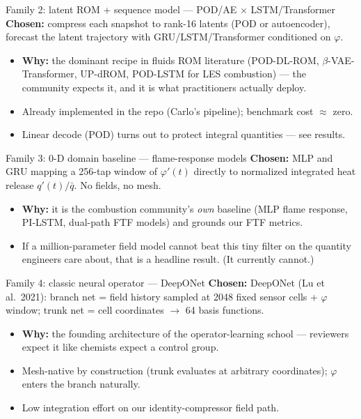 \documentclass[10pt]{beamer}
\begin{document}
\begin{frame}{Family 2: latent ROM + sequence model --- POD/AE $\times$ LSTM/Transformer}
  \textbf{Chosen:} compress each snapshot to rank-16 latents (POD or autoencoder), forecast the
  latent trajectory with GRU/LSTM/Transformer conditioned on $\varphi$.
  \begin{itemize}
    \item \textbf{Why:} the dominant recipe in fluids ROM literature
          (POD-DL-ROM, $\beta$-VAE-Transformer, UP-dROM, POD-LSTM for LES combustion) ---
          the community expects it, and it is what practitioners actually deploy.
    \item Already implemented in the repo (Carlo's pipeline); benchmark cost $\approx$ zero.
    \item Linear decode (POD) turns out to protect integral quantities --- see results.
  \end{itemize}
\end{frame}

\begin{frame}{Family 3: 0-D domain baseline --- flame-response models}
  \textbf{Chosen:} MLP and GRU mapping a 256-tap window of $\varphi'(t)$ directly to normalized
  integrated heat release $q'(t)/\bar q$. No fields, no mesh.
  \begin{itemize}
    \item \textbf{Why:} it is the combustion community's \emph{own} baseline
          (MLP flame response, PI-LSTM, dual-path FTF models) and grounds our FTF metrics.
    \item If a million-parameter field model cannot beat this tiny filter on the quantity
          engineers care about, that is a headline result. (It currently cannot.)
  \end{itemize}
\end{frame}

\begin{frame}{Family 4: classic neural operator --- DeepONet}
  \textbf{Chosen:} DeepONet (Lu et al.\ 2021): branch net = field history sampled at 2048 fixed
  sensor cells + $\varphi$ window; trunk net = cell coordinates $\to$ 64 basis functions.
  \begin{itemize}
    \item \textbf{Why:} the founding architecture of the operator-learning school ---
          reviewers expect it like chemists expect a control group.
    \item Mesh-native by construction (trunk evaluates at arbitrary coordinates);
          $\varphi$ enters the branch naturally.
    \item Low integration effort on our identity-compressor field path.
  \end{itemize}
\end{frame}
\end{document}
